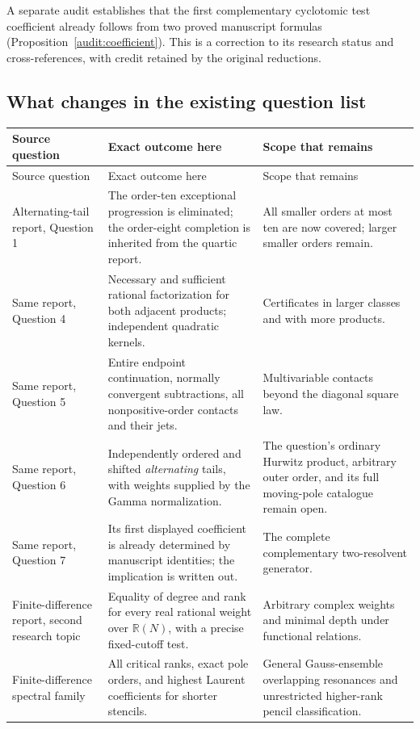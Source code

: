 \documentclass[11pt]{article}
\theoremstyle{definition}
\theoremstyle{remark}
\numberwithin{equation}{section}
\newcommand{\R}{\mathbb R}
\begin{document}
A separate audit establishes that the first complementary cyclotomic
test coefficient already follows from two proved manuscript formulas
(Proposition~\ref{audit:coefficient}). This is a correction to its
research status and cross-references, with credit retained by the
original reductions.

\subsection{What changes in the existing question list}

\begingroup\small
\begin{longtable}{@{}>{\raggedright\arraybackslash}p{}>{\raggedright\arraybackslash}p{}>{\raggedright\arraybackslash}p{}@{}}
\toprule
Source question & Exact outcome here & Scope that remains \\
\midrule
\endfirsthead
\toprule Source question & Exact outcome here & Scope that remains \\
\midrule\endhead
Alternating-tail report, Question 1 & The order-ten exceptional
progression is eliminated; the order-eight completion is inherited
from the quartic report. & All smaller orders at most ten are now
covered; larger smaller orders remain. \\
\addlinespace
Same report, Question 4 & Necessary and sufficient rational
factorization for both adjacent products; independent quadratic
kernels. & Certificates in larger classes and with more products. \\
\addlinespace
Same report, Question 5 & Entire endpoint continuation, normally
convergent subtractions, all nonpositive-order contacts and their jets. &
Multivariable contacts beyond the diagonal square law. \\
\addlinespace
Same report, Question 6 & Independently ordered and shifted
\emph{alternating} tails, with weights supplied by the Gamma
normalization. & The question's ordinary Hurwitz product, arbitrary
outer order, and its full moving-pole catalogue remain open. \\
\addlinespace
Same report, Question 7 & Its first displayed coefficient is already
determined by manuscript identities; the implication is written out. &
The complete complementary two-resolvent generator. \\
\addlinespace
Finite-difference report, second research topic & Equality of degree
and rank for every real rational weight over $\R(N)$, with a precise
fixed-cutoff test. & Arbitrary complex weights and minimal depth
under functional relations. \\
\addlinespace
Finite-difference spectral family & All critical ranks, exact pole
orders, and highest Laurent coefficients for shorter stencils. &
General Gauss-ensemble overlapping resonances and unrestricted
higher-rank pencil classification. \\
\bottomrule
\end{longtable}
\endgroup
\end{document}
